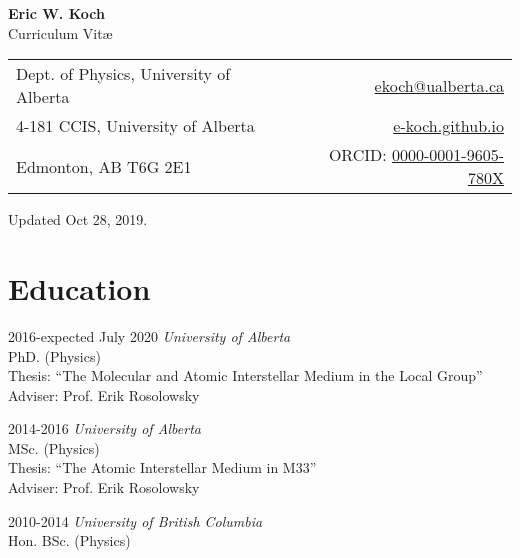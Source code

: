 \documentclass[letterpaper,11pt]{article}
\makeatletter
\newcommand{\myname}{Eric W. Koch}
\newcommand{\myaffil}{Dept. of Physics, University of Alberta}
\newcommand{\myemail}{ekoch@ualberta.ca}
\newcommand{\mypostlineone}{4-181 CCIS, University of Alberta}
\newcommand{\mypostlinetwo}{Edmonton, AB T6G 2E1}
\newcommand{\mysite}{e-koch.github.io}
\newcommand{\myorcid}{https://orcid.org/0000-0001-9605-780X}
\newlength{\mainindent} \setlength{\mainindent}{12pt}
\newlength{\contentindent} \setlength{\contentindent}{19ex}
\newenvironment{datelist}{
  \begingroup
  \raggedright
  \begin{description}[labelindent=\mainindent,leftmargin=\contentindent,
      style=sameline,font=\normalfont,topsep=0pt,partopsep=0pt,parsep=0pt,
      itemsep=4pt]
}{
  \end{description}
  \endgroup
}
\makeatother
\begin{document}
\pagestyle{fancy}
\lhead{} \chead{} \rhead{} \renewcommand{\headrule}{\relax}
\cfoot{\thepage/\pageref*{LastPage}}
\rfoot{\textsc{\myname}}

\begin{center}
\textbf{\Large \myname} \\
{\large Curriculum Vit\ae}
\end{center}

\medskip

\begin{tabular*}{\textwidth}{@{\extracolsep{\fill}}lr}
\myaffil &
 \textsf{\href{mailto:\myemail}{\myemail}} \\
\mypostlineone &
 \url{\mysite} \\
\mypostlinetwo &
  \textsf{ORCID: \href{\myorcid}{0000-0001-9605-780X}} \\
\end{tabular*}

\medskip


Updated %
Oct 28, 2019.

\section*{Education}
\begin{datelist}
\item[2016-expected July 2020]
  \emph{University of Alberta} \\
  PhD. (Physics) \\
  Thesis: {``The Molecular and Atomic Interstellar Medium in the Local Group''} \\
  Adviser: Prof. Erik Rosolowsky
\item[2014-2016]
  \emph{University of Alberta} \\
  MSc. (Physics) \\
  Thesis: {``The Atomic Interstellar Medium in M33''} \\
  Adviser: Prof. Erik Rosolowsky
\item[2010-2014]
  \emph{University of British Columbia} \\
  Hon. BSc. (Physics)
\end{datelist}
\end{document}
